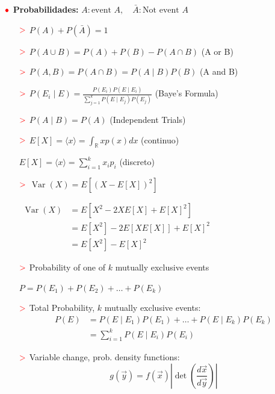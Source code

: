 \documentclass[%
 reprint,
 amsmath,amssymb,
 aps,
]{revtex4-1}
\begin{document}
\textbf{$\color{red}{\bullet}$ Probabilidades:} $A: \text{event }A, \quad \bar{A}: \text{Not event }A $
\begin{itemize}
  \item[$\textcolor{red}{\mathbf{>}}$] $P(A)+P(\bar{A})=1$
  \item[$\textcolor{red}{\mathbf{>}}$] $P(A \cup B)=P(A)+P(B)-P(A \cap B)$ (A or B)
  \item[$\textcolor{red}{\mathbf{>}}$] $P(A, B)=P(A \cap B)=P(A \mid B) P(B)$ (A and B)
  \item[$\textcolor{red}{\mathbf{>}}$] $P\left(E_{i} \mid E\right)=\frac{P\left(E_{i}\right) P\left(E \mid E_{i}\right)}{\sum_{j=1}^{k} P\left(E \mid E_{j}\right) P\left(E_{j}\right)}$ (Baye's Formula)
  \item[$\textcolor{red}{\mathbf{>}}$] $P(A \mid B)=P(A)$ (Independent Trials)

  \item[$\textcolor{red}{\mathbf{>}}$] 
  $E[X] =\langle x \rangle = \int_\mathbb{R} x p(x) dx$ (continuo)

  $E[X] =\langle x \rangle = \sum_{i=1}^k x_i p_i$ (discreto)
  
  \item[$\textcolor{red}{\mathbf{>}}$] 
  $\operatorname{Var}(X) =E\left[(X-E[X])^{2}\right]$

  $
  \begin{aligned}
  \operatorname{Var}(X) &=E\left[X^{2}-2 X E[X]+E[X]^{2}\right] \\
  &=E\left[X^{2}\right] - 2 E[X E[X] ] +E[X]^{2} \\
  &=E\left[X^{2}\right]-E[X]^{2}
  \end{aligned}
  $

  \item[$\textcolor{red}{\mathbf{>}}$] Probability of one of $k$ mutually exclusive events
  
  $
  P=P\left(E_{1}\right)+P\left(E_{2}\right)+\ldots+P\left(E_{k}\right)
  $
  
  \item[$\textcolor{red}{\mathbf{>}}$]
  Total Probability, $k$ mutually exclusive events:
  $$
  \begin{aligned}
    P(E)&=P\left(E \mid E_{1}\right) P\left(E_{1}\right)+\ldots+P\left(E \mid E_{k}\right) P\left(E_{k}\right)\\
    &=\sum_{i=1}^{k} P\left(E \mid E_{i}\right) P\left(E_{i}\right) 
  \end{aligned}
  $$

  \item[$\textcolor{red}{\mathbf{>}}$] Variable change, prob. density functions:
  $$
  g(\vec{y}) = f(\vec{x}) \left|
    {
    \det
  \left(\frac{d\vec{x}}{d\vec{y}}\right)
  }
  \right|
  $$
\end{itemize}
\end{document}
